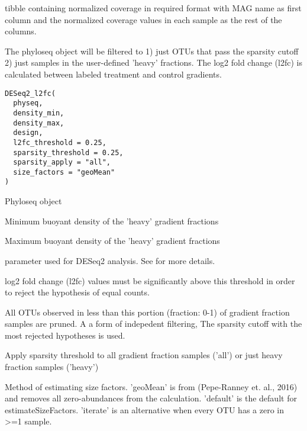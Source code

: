 \documentclass[a4paper]{book}
\begin{document}
%
\begin{Value}
tibble containing normalized coverage in required format with MAG name as first column and the normalized coverage values in each sample as the rest of the columns.
\end{Value}
%
\begin{Description}\relax
The phyloseq object will be filtered to 1) just OTUs
that pass the sparsity cutoff 2) just samples in the user-defined
'heavy' fractions. The log2 fold change (l2fc) is calculated
between labeled treatment and control gradients.
\end{Description}
%
\begin{Usage}
\begin{verbatim}
DESeq2_l2fc(
  physeq,
  density_min,
  density_max,
  design,
  l2fc_threshold = 0.25,
  sparsity_threshold = 0.25,
  sparsity_apply = "all",
  size_factors = "geoMean"
)
\end{verbatim}
\end{Usage}
%
\begin{Arguments}
\begin{ldescription}
\item[\code{physeq}] Phyloseq object

\item[\code{density\_min}] Minimum buoyant density of the 'heavy' gradient fractions

\item[\code{density\_max}] Maximum buoyant density of the 'heavy' gradient fractions

\item[\code{design}]  parameter used for DESeq2 analysis.
See  for more details.

\item[\code{l2fc\_threshold}] log2 fold change (l2fc) values must be significantly above this
threshold in order to reject the hypothesis of equal counts.

\item[\code{sparsity\_threshold}] All OTUs observed in less than this portion (fraction: 0-1)
of gradient fraction samples are pruned. A a form of indepedent filtering,
The sparsity cutoff with the most rejected hypotheses is used.

\item[\code{sparsity\_apply}] Apply sparsity threshold to all gradient fraction samples ('all')
or just heavy fraction samples ('heavy')

\item[\code{size\_factors}] Method of estimating size factors.
'geoMean' is from (Pepe-Ranney et. al., 2016) and removes all zero-abundances from the calculation.
'default' is the default for estimateSizeFactors.
'iterate' is an alternative when every OTU has a zero in >=1 sample.
\end{ldescription}
\end{Arguments}
\end{document}
